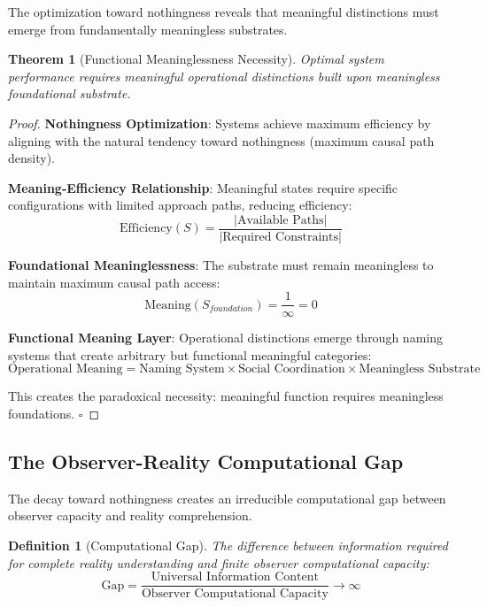 \documentclass[12pt,a4paper]{article}
\newtheorem{theorem}{Theorem}
\newtheorem{definition}{Definition}
\begin{document}
The optimization toward nothingness reveals that meaningful distinctions must emerge from fundamentally meaningless substrates.

\begin{theorem}[Functional Meaninglessness Necessity]
Optimal system performance requires meaningful operational distinctions built upon meaningless foundational substrate.
\end{theorem}

\begin{proof}
\textbf{Nothingness Optimization}: Systems achieve maximum efficiency by aligning with the natural tendency toward nothingness (maximum causal path density).

\textbf{Meaning-Efficiency Relationship}: Meaningful states require specific configurations with limited approach paths, reducing efficiency:
\begin{equation}
\text{Efficiency}(S) = \frac{|\text{Available Paths}|}{|\text{Required Constraints}|}
\end{equation}

\textbf{Foundational Meaninglessness}: The substrate must remain meaningless to maintain maximum causal path access:
\begin{equation}
\text{Meaning}(S_{foundation}) = \frac{1}{\infty} = 0
\end{equation}

\textbf{Functional Meaning Layer}: Operational distinctions emerge through naming systems that create arbitrary but functional meaningful categories:
\begin{equation}
\text{Operational Meaning} = \text{Naming System} \times \text{Social Coordination} \times \text{Meaningless Substrate}
\end{equation}

This creates the paradoxical necessity: meaningful function requires meaningless foundations. $\square$
\end{proof}

\subsection{The Observer-Reality Computational Gap}

The decay toward nothingness creates an irreducible computational gap between observer capacity and reality comprehension.

\begin{definition}[Computational Gap]
The difference between information required for complete reality understanding and finite observer computational capacity:
\begin{equation}
\text{Gap} = \frac{\text{Universal Information Content}}{\text{Observer Computational Capacity}} \to \infty
\end{equation}
\end{definition}
\end{document}
